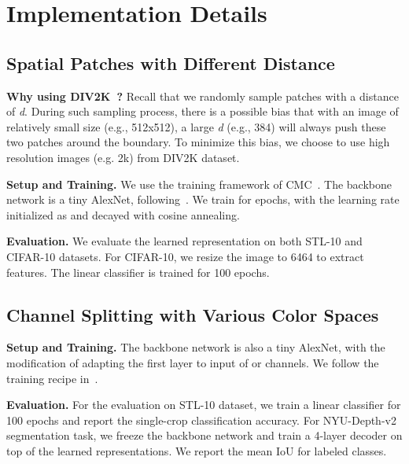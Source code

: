 \documentclass{article}
\begin{document}
\section{Implementation Details}






\subsection{Spatial Patches with Different Distance}
\textbf{Why using DIV2K~\cite{agustsson2017ntire}?} Recall that we randomly sample patches with a distance of \emph{d}. During such sampling process, there is a possible bias that with an image of relatively small size (e.g., 512x512),
a large \emph{d} (e.g., 384) will always push these two patches around the boundary. To minimize this bias, we choose to use high resolution images (e.g. 2k) from DIV2K dataset.

\textbf{Setup and Training.} We use the training framework of CMC~\cite{tian2019contrastive}. The backbone network is a tiny AlexNet, following~\cite{hjelm2018learning,tian2019contrastive}. We train for  epochs, with the learning rate initialized as  and decayed with cosine annealing.

\noindent \textbf{Evaluation.} We evaluate the learned representation on both STL-10 and CIFAR-10 datasets. For CIFAR-10, we resize the image to 6464 to extract features. The linear classifier is trained for 100 epochs.

\subsection{Channel Splitting with Various Color Spaces}\label{sec:color}
\textbf{Setup and Training.} The backbone network is also a tiny AlexNet, with the modification of adapting the first layer to input of  or  channels. We follow the training recipe in~\cite{tian2019contrastive}.

\noindent \textbf{Evaluation.} For the evaluation on STL-10 dataset, we train a linear classifier for 100 epochs and report the single-crop classification accuracy. For NYU-Depth-v2 segmentation task, we freeze the backbone network and train a 4-layer decoder on top of the learned representations. We report the mean IoU for labeled classes.
\end{document}
